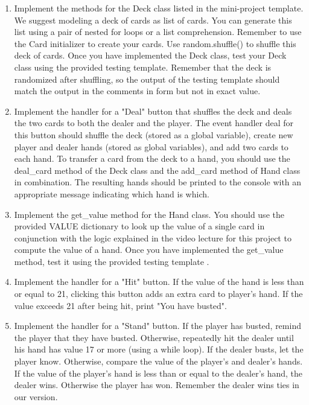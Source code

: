 \documentclass[a4paper,14pt]{article}
\begin{document}
\begin{CJK}{UTF8}{gkai}
\begin{enumerate}
\item \noindent Implement the methods for the Deck class listed in the mini-project template. We suggest modeling a deck of cards as list of cards. You can generate this list using a pair of nested for loops or a list comprehension. Remember to use the Card initializer to create your cards. Use random.shuffle() to shuffle this deck of cards. Once you have implemented the Deck class, test your Deck class using the provided testing template. Remember that the deck is randomized after shuffling, so the output of the testing template should match the output in the comments in form but not in exact value.

\item Implement the handler for a "Deal" button that shuffles the deck and deals the two cards to both the dealer and the player. The event handler deal for this button should shuffle the deck (stored as a global variable), create new player and dealer hands (stored as global variables), and add two cards to each hand. To transfer a card from the deck to a hand, you should use the deal\_card method of the Deck class and the add\_card method of Hand class in combination. The resulting hands should be printed to the console with an appropriate message indicating which hand is which.

\item \noindent Implement the get\_value method for the Hand class. You should use the provided VALUE dictionary to look up the value of a single card in conjunction with the logic explained in the video lecture for this project to compute the value of a hand. Once you have implemented the get\_value method, test it using the provided testing template . 

\item \noindent Implement the handler for a "Hit" button. If the value of the hand is less than or equal to 21, clicking this button adds an extra card to player's hand. If the value exceeds 21 after being hit, print "You have busted".

\item Implement the handler for a "Stand" button. If the player has busted, remind the player that they have busted. Otherwise, repeatedly hit the dealer until his hand has value 17 or more (using a while loop). If the dealer busts, let the player know. Otherwise, compare the value of the player's and dealer's hands. If the value of the player's hand is less than or equal to the dealer's hand, the dealer wins. Otherwise the player has won. Remember the dealer wins ties in our version.


\end{enumerate}
\end{CJK}
\end{document}
